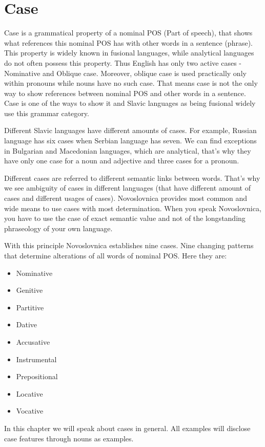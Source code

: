 \section{Case}

Case is a grammatical property of a nominal POS (Part of speech), that shows what references this nominal POS has with other words in a sentence (phrase). This property is widely known in fusional languages, while analytical languages do not often possess this property. Thus English has only two active cases - Nominative and Oblique case. Moreover, oblique case is used practically only within pronouns while nouns have no such case. That means case is not the only way to show references between nominal POS and other words in a sentence. Case is one of the ways to show it and Slavic languages as being fusional widely use this grammar category.

Different Slavic languages have different amounts of cases. For example, Russian language has six cases when Serbian language has seven. We can find exceptions in Bulgarian and Macedonian languages, which are analytical, that’s why they have only one case for a noun and adjective and three cases for a pronoun.

Different cases are referred to different semantic links between words. That’s why we see ambiguity of cases in different languages (that have different amount of cases and different usages of cases). Novoslovnica provides most common and wide means to use cases with most determination. When you speak Novoslovnica, you have to use the case of exact semantic value and not of the longstanding phraseology of your own language.

With this principle Novoslovnica establishes nine cases. Nine changing patterns that determine alterations of all words of nominal POS. Here they are:

\begin{itemize}
	\item Nominative
	\item Genitive
	\item Partitive
	\item Dative
	\item Accusative
	\item Instrumental
	\item Prepositional
	\item Locative
	\item Vocative
\end{itemize}

In this chapter we will speak about cases in general. All examples will disclose case features through nouns as examples.

